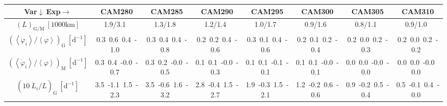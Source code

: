 \setlength\tabcolsep{1.5pt}

\begin{table}[H]
{\footnotesize
\begin{centering}
\begin{tabular}{|c|c|c|c|c|c|c|c|}
\hline
Var$\downarrow\ $Exp$\rightarrow$ & CAM280 & CAM285 & CAM290 & CAM295 & CAM300 & CAM305 & CAM310 \tabularnewline
\hline
\hline
$\left(L\right)_{\mathrm{G/M}}\ \left[1000\mathrm{km}\right]$ & 1.9/3.1\ & 1.3/1.8\ & 1.2/1.4\ & 1.0/1.7\ & 0.9/1.6\ & 0.8/1.1\ & 0.9/1.0\ \tabularnewline
\hline
$\left(\left\langle \dot{\varphi}_{i}\right\rangle /\left\langle \varphi\right\rangle\right) _{\mathrm{G}}\ \left[\mathrm{d^{-1}}\right]$ & \textcolor{C1}{0.3}\ \textcolor{C2}{0.6}\ \textcolor{C3}{0.4}\ \textcolor{C4}{-1.0}\  & \textcolor{C1}{0.3}\ \textcolor{C2}{0.4}\ \textcolor{C3}{0.4}\ \textcolor{C4}{-0.8}\  & \textcolor{C1}{0.2}\ \textcolor{C2}{0.2}\ \textcolor{C3}{0.4}\ \textcolor{C4}{-0.6}\  & \textcolor{C1}{0.3}\ \textcolor{C2}{0.1}\ \textcolor{C3}{0.4}\ \textcolor{C4}{-0.6}\  & \textcolor{C1}{0.2}\ \textcolor{C2}{0.1}\ \textcolor{C3}{0.2}\ \textcolor{C4}{-0.4}\  & \textcolor{C1}{0.2}\ \textcolor{C2}{0.0}\ \textcolor{C3}{0.2}\ \textcolor{C4}{-0.3}\  & \textcolor{C1}{0.2}\ \textcolor{C2}{0.0}\ \textcolor{C3}{0.2}\ \textcolor{C4}{-0.2}\  \tabularnewline
\hline
$\left(\left\langle \dot{\varphi}_{i}\right\rangle /\left\langle \varphi\right\rangle\right) _{\mathrm{M}}\ \left[\mathrm{d^{-1}}\right]$ & \textcolor{C1}{0.3}\ \textcolor{C2}{0.4}\ \textcolor{C3}{-0.0}\ \textcolor{C4}{-0.7}\  & \textcolor{C1}{0.3}\ \textcolor{C2}{0.2}\ \textcolor{C3}{-0.0}\ \textcolor{C4}{-0.5}\  & \textcolor{C1}{0.1}\ \textcolor{C2}{0.1}\ \textcolor{C3}{-0.0}\ \textcolor{C4}{-0.3}\  & \textcolor{C1}{0.1}\ \textcolor{C2}{0.1}\ \textcolor{C3}{-0.1}\ \textcolor{C4}{-0.1}\  & \textcolor{C1}{0.1}\ \textcolor{C2}{0.1}\ \textcolor{C3}{-0.0}\ \textcolor{C4}{-0.1}\  & \textcolor{C1}{0.0}\ \textcolor{C2}{0.0}\ \textcolor{C3}{-0.0}\ \textcolor{C4}{-0.0}\  & \textcolor{C1}{0.0}\ \textcolor{C2}{0.0}\ \textcolor{C3}{-0.0}\ \textcolor{C4}{0.0}\  \tabularnewline
\hline
$\left(10\ \dot{L}_{i}/L\right)_{\mathrm{G}}\ \left[\mathrm{d^{-1}}\right]$ & \textcolor{C1}{3.5}\ \textcolor{C2}{-1.1}\ \textcolor{C3}{1.5}\ \textcolor{C4}{-2.3}\  & \textcolor{C1}{3.5}\ \textcolor{C2}{-0.6}\ \textcolor{C3}{1.6}\ \textcolor{C4}{-3.2}\  & \textcolor{C1}{2.8}\ \textcolor{C2}{-0.4}\ \textcolor{C3}{1.5}\ \textcolor{C4}{-2.7}\  & \textcolor{C1}{1.9}\ \textcolor{C2}{-0.3}\ \textcolor{C3}{1.5}\ \textcolor{C4}{-2.1}\  & \textcolor{C1}{1.2}\ \textcolor{C2}{-0.2}\ \textcolor{C3}{0.6}\ \textcolor{C4}{-0.6}\  & \textcolor{C1}{0.9}\ \textcolor{C2}{-0.2}\ \textcolor{C3}{0.5}\ \textcolor{C4}{-0.4}\  & \textcolor{C1}{0.5}\ \textcolor{C2}{-0.1}\ \textcolor{C3}{0.4}\ \textcolor{C4}{-0.0}\  \tabularnewline

\end{tabular}
\end{centering}}
\end{table}
